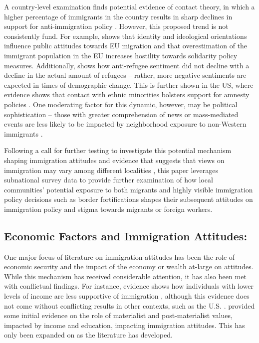 \documentclass[12pt,]{article}
\begin{document}
A country-level examination finds potential evidence of contact theory,
in which a higher percentage of immigrants in the country results in
sharp declines in support for anti-immigration policy \citep{young2018}.
However, this proposed trend is not consistently fund. For example,
\citet{basile2020} shows that identity and ideological orientations
influence public attitudes towards EU migration and that overestimation
of the immigrant population in the EU increases hostility towards
solidarity policy measures. Additionally, \citet{czymara2021} shows how
anti-refugee sentiment did not decline with a decline in the actual
amount of refugees -- rather, more negative sentiments are expected in
times of demographic change. This is further shown in the US, where
evidence shows that contact with ethnic minorities bolsters support for
amnesty policies \citep{ayers2009}. One moderating factor for this
dynamic, however, may be political sophistication -- those with greater
comprehension of news or mass-mediated events are less likely to be
impacted by neighborhood exposure to non-Western immigrants
\citep{danckert2017}.

Following a call for further testing to investigate this potential
mechanism shaping immigration attitudes \citep{young2018} and evidence
that suggests that views on immigration may vary among different
localities \citep{arvanitidis2021}, this paper leverages subnational
survey data to provide further examination of how local communities'
potential exposure to both migrants and highly visible immigration
policy decisions such as border fortifications shapes their subsequent
attitudes on immigration policy and stigma towards migrants or foreign
workers.

\subsection{Economic Factors and Immigration
Attitudes:}\label{economic-factors-and-immigration-attitudes}

One major focus of literature on immigration attitudes has been the role
of economic security and the impact of the economy or wealth at-large on
attitudes. While this mechanism has received considerable attention, it
has also been met with conflictual findings. For instance, evidence
shows how individuals with lower levels of income are less supportive of
immigration \citep{arvanitidis2021, young2018, hoskin1983}, although
this evidence does not come without conflicting results in other
contexts, such as the U.S. \citep{binder1997}. \citet{hoskin1983}
provided some initial evidence on the role of materialist and
post-materialist values, impacted by income and education, impacting
immigration attitudes. This has only been expanded on as the literature
has developed.
\end{document}
